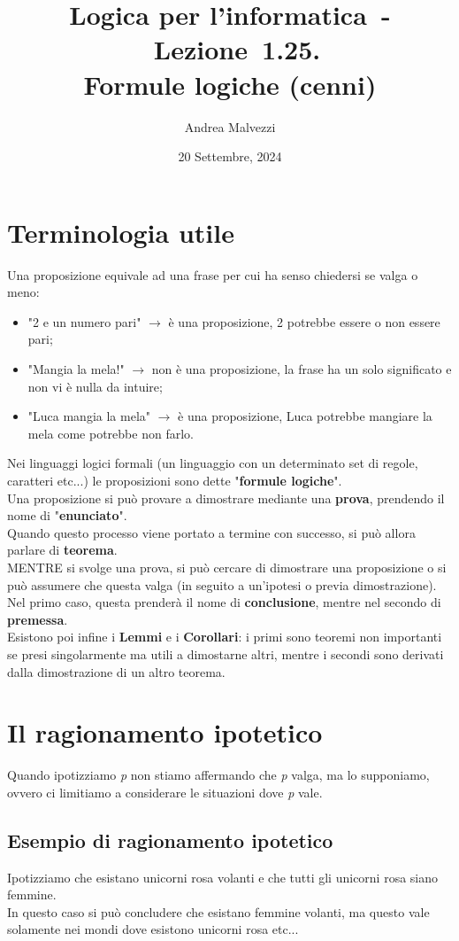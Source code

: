 \documentclass[12pt]{article}
\author{Andrea Malvezzi}
\title{\textbf{Logica per l'informatica~-~Lezione~1.25.\\Formule logiche (cenni)}}
\date{20 Settembre, 2024}
\begin{document}
\maketitle
\pagebreak
\section{Terminologia utile}
Una proposizione equivale ad una frase per cui ha senso chiedersi se valga o meno:
\begin{itemize}
    \item "2 e un numero pari" $\rightarrow$ è una proposizione, 2 potrebbe essere o non essere pari;
    \item "Mangia la mela!" $\rightarrow$ non è una proposizione, la frase ha un solo significato e non vi è nulla da intuire;
    \item "Luca mangia la mela" $\rightarrow$ è una proposizione, Luca potrebbe mangiare la mela come potrebbe non farlo.
\end{itemize}
Nei linguaggi logici formali (un linguaggio con un determinato set di regole, caratteri etc...) le proposizioni sono dette "\textbf{formule logiche}".\\
Una proposizione si può provare a dimostrare mediante una \textbf{prova}, prendendo il nome di "\textbf{enunciato}".\\
Quando questo processo viene portato a termine con successo, si può allora parlare di \textbf{teorema}.\\
MENTRE si svolge una prova, si può cercare di dimostrare una proposizione o si può assumere che questa valga (in seguito a un'ipotesi o previa dimostrazione).\\
Nel primo caso, questa prenderà il nome di \textbf{conclusione}, mentre nel secondo di \textbf{premessa}.\\
Esistono poi infine i \textbf{Lemmi} e i \textbf{Corollari}: i primi sono teoremi non importanti se presi singolarmente ma utili a dimostarne altri, mentre i secondi sono derivati dalla dimostrazione di un altro teorema. 
\section{Il ragionamento ipotetico}
Quando ipotizziamo \textit{p} non stiamo affermando che \textit{p} valga, ma lo supponiamo, ovvero ci limitiamo a considerare le situazioni dove \textit{p} vale.
\subsection*{Esempio di ragionamento ipotetico}
Ipotizziamo che esistano unicorni rosa volanti e che tutti gli unicorni rosa siano femmine.\\
In questo caso si può concludere che esistano femmine volanti, ma questo vale solamente nei mondi dove esistono unicorni rosa etc... 
\end{document}

